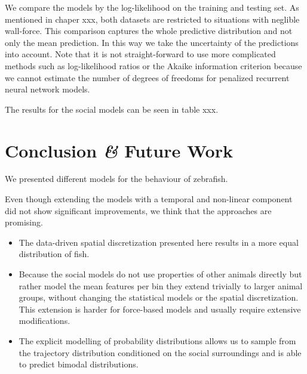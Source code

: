 \documentclass[nobib]{tufte-handout}
\begin{document}
We compare the models by the log-likelihood on the training and testing set.
As mentioned in chaper xxx, both datasets are restricted to situations with neglible wall-force.
This comparison captures the whole predictive distribution and not only the mean prediction.
In this way we take the uncertainty of the predictions into account.
Note that it is not straight-forward to use more complicated methods such as log-likelihood ratios or the Akaike information criterion because we cannot estimate the number of degrees of freedoms for penalized recurrent neural network models.

The results for the social models can be seen in table xxx.


\section{Conclusion \textit{\&} Future Work}
We presented different models for the behaviour of zebrafish.

Even though extending the models with a temporal and non-linear component did not show significant improvements, we think that the approaches are promising.
\begin{itemize}
\item The data-driven spatial discretization presented here results in a more equal distribution of fish.
\item Because the social models do not use properties of other animals directly but rather model the mean features per bin they extend trivially to larger animal groups, without changing the statistical models or the spatial discretization.
  This extension is harder for force-based models and usually require extensive modifications.
\item The explicit modelling of probability distributions allows us to sample from the trajectory distribution conditioned on the social surroundings and is able to predict bimodal distributions.
\end{itemize}

\printbibliography
\end{document}
